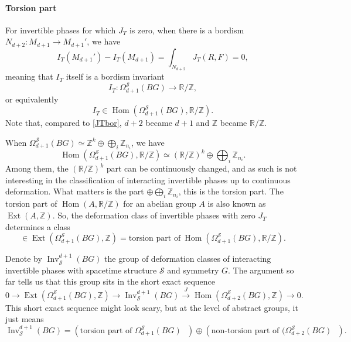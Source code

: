 \documentclass[12pt]{article}
\numberwithin{equation}{section}
\numberwithin{figure}{section}
\theoremstyle{remark}
\def\bR{\mathbb{R}}
\def\bZ{\mathbb{Z}}
\def\cS{\mathcal{S}}
\def\Hom{\mathop{\mathrm{Hom}}}
\def\Inv{\mathop{\mathrm{Inv}}\nolimits}
\def\Ext{\mathop{\mathrm{Ext}}}
\begin{document}
\paragraph{Torsion part}
For invertible phases for which $J_T$ is zero, when there is a bordism $N_{d+2}:M_{d+1}\to M_{d+1}'$,
we have \begin{equation}
I_T(M_{d+1}') - I_T(M_{d+1}) = \int_{N_{d+2}} J_T(R,F)=0,
\end{equation} meaning that $I_T$ itself is a bordism invariant \begin{equation}
I_T : \Omega^\cS_{d+1}(BG)\to \bR/\bZ \label{ITbor},
\end{equation}  or equivalently \begin{equation}
I_T \in \Hom(\Omega^\cS_{d+1}(BG),\bR/\bZ).
\end{equation}
Note that, compared to \eqref{JTbor}, $d+2$ became $d+1$ and $\bZ$ became $\bR/\bZ$.

When $\Omega^\cS_{d+1}(BG)\simeq \bZ^k \oplus\bigoplus_i \bZ_{n_i}$, we have \begin{equation}
\Hom(\Omega^\cS_{d+1}(BG),\bR/\bZ) \simeq (\bR/\bZ)^k \oplus\bigoplus_i \bZ_{n_i}.
\end{equation}
Among them, the $(\bR/\bZ)^k$ part can be continuously changed,
and as such is not interesting in the classification of interacting invertible phases up to continuous deformation.
What matters is the part $\oplus \bigoplus_i \bZ_{n_i}$, this is the torsion part.
The torsion part of $\Hom(A,\bR/\bZ)$ for an abelian group $A$ is also known as $\Ext(A,\bZ)$.
So, the deformation class of invertible phases with zero $J_T$ determines a class \begin{equation}
[I_T] \in \Ext(\Omega^\cS_{d+1}(BG),\bZ) = \text{torsion part of}\ \Hom(\Omega^\cS_{d+1}(BG),\bR/\bZ).
\end{equation}

Denote by $\Inv^{d+1}_\cS(BG)$ the group of deformation classes of interacting invertible phases with 
spacetime structure $\cS$ and symmetry $G$. 
The argument so far tells us that this group sits in the short exact sequence \begin{equation}
0\to \Ext(\Omega^\cS_{d+1}(BG),\bZ) 
\to \Inv^{d+1}_\cS(BG) \xrightarrow{J} \Hom(\Omega^\cS_{d+2}(BG),\bZ)\to 0.
\end{equation}
This short exact sequence might look scary, but at the level of abstract groups, it just means \begin{equation}
\Inv^{d+1}_\cS(BG) =
 (\text{torsion part of $\Omega^\cS_{d+1}(BG)$ })
\oplus 
 (\text{non-torsion part of $(\Omega^\cS_{d+2}(BG)$ } ).
\end{equation}
\end{document}
